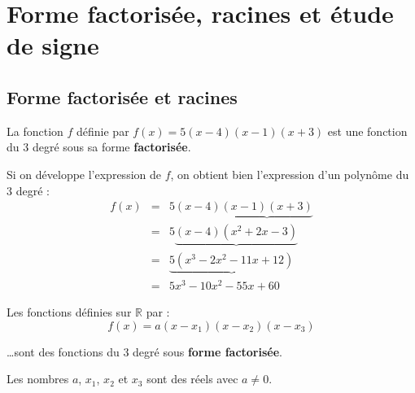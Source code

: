 \section{Forme factorisée, racines et étude de signe}

\subsection{Forme factorisée et racines}

\begin{ex}
	La fonction $f$ définie par $f(x)=5(x-4)(x-1)(x+3)$ est une fonction du $3$ degré sous sa forme \textbf{factorisée}.

	Si on développe l'expression de $f$, on obtient bien l'expression d'un polynôme du $3$ degré :
	\[
		\begin{array}{rcl}
			f(x) & = & 5(x-4)\underbrace{(x-1)(x+3)}   \\
			     & = & 5\underbrace{(x-4)(x^2+2x-3)}   \\
			     & = & \underbrace{5(x^3-2x^2-11x+12)} \\
			     & = & 5x^{3}-10x^{2}-55x+60
		\end{array}
	\]
\end{ex}

\begin{defin}
	Les fonctions définies sur $\mathbb{R}$ par :
	\[
		f(x)=a(x-x_{1})(x-x_{2})(x-x_{3})
	\]

	\ldots sont des fonctions du $3$ degré sous \textbf{forme factorisée}.

	Les nombres $a$, $x_{1}$, $x_{2}$ et $x_{3}$ sont des réels avec $a \neq 0$.
\end{defin}

